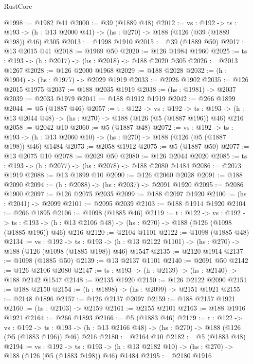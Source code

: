 \begin{lexlean}{RustCore}
\begin{coremodule}
@1998 := @1982 @41
@2000 := @39 (@1889 @48)
@2012 := {vs : @192} ->
  {ts : @193} -> (h : @13 @2000 @41) -> (hs : @270) -> @188 (@126 (@39 (@1889 @198)) @46) @305
@2013 := @1998 @1910
@2015 := @39 (@1889 @50)
@2017 := @13 @2015 @41
@2018 := @1969 @50
@2020 := @126 @1984 @1960
@2025 := {ts : @193} -> (h : @2017) -> (hs : @2018) -> @188 @2020 @305
@2026 := @2013 @1267
@2028 := @126 @2000 @1968
@2029 := @188 @2028
@2032 := (h : @1904) -> (hs : @1977) -> @2029 @1919
@2033 := @2026 @1902
@2035 := @126 @2015 @1975
@2037 := @188 @2035 @1919
@2038 := (hs : @1981) -> @2037
@2039 := @2033 @1979
@2041 := @188 @1912 @1919
@2042 := @266 @1899
@2044 := @5 (@1887 @46)
@2057 := {t : @122} ->
  {vs : @192} ->
  {ts : @193} -> (h : @13 @2044 @48) -> (hs : @270) -> @188 (@126 (@5 (@1887 @196)) @46) @216
@2058 := @2042 @10
@2060 := @5 (@1887 @48)
@2072 := {vs : @192} ->
  {ts : @193} -> (h : @13 @2060 @10) -> (hs : @270) -> @188 (@126 (@5 (@1887 @198)) @46) @1484
@2073 := @2058 @1912
@2075 := @5 (@1887 @50)
@2077 := @13 @2075 @10
@2078 := @2029 @50
@2080 := @126 @2044 @2020
@2085 := {ts : @193} -> (h : @2077) -> (hs : @2078) -> @188 @2080 @1484
@2086 := @2073 @1919
@2088 := @13 @1899 @10
@2090 := @126 @2060 @2028
@2091 := @188 @2090
@2094 := (h : @2088) -> (hs : @2037) -> @2091 @1920
@2095 := @2086 @1900
@2097 := @126 @2075 @2035
@2099 := @188 @2097 @1920
@2100 := (hs : @2041) -> @2099
@2101 := @2095 @2039
@2103 := @188 @1914 @1920
@2104 := @266 @1895
@2106 := @1098 (@1885 @46)
@2119 := {t : @122} ->
  {vs : @192} ->
  {ts : @193} -> (h : @13 @2106 @48) -> (hs : @270) -> @188 (@126 (@1098 (@1885 @196)) @46) @216
@2120 := @2104 @1101
@2122 := @1098 (@1885 @48)
@2134 := {vs : @192} ->
  {ts : @193} -> (h : @13 @2122 @1101) -> (hs : @270) -> @188 (@126 (@1098 (@1885 @198)) @46) @1547
@2135 := @2120 @1914
@2137 := @1098 (@1885 @50)
@2139 := @13 @2137 @1101
@2140 := @2091 @50
@2142 := @126 @2106 @2080
@2147 := {ts : @193} -> (h : @2139) -> (hs : @2140) -> @188 @2142 @1547
@2148 := @2135 @1920
@2150 := @126 @2122 @2090
@2151 := @188 @2150
@2154 := (h : @1898) -> (hs : @2099) -> @2151 @1921
@2155 := @2148 @1896
@2157 := @126 @2137 @2097
@2159 := @188 @2157 @1921
@2160 := (hs : @2103) -> @2159
@2161 := @2155 @2101
@2163 := @188 @1916 @1921
@2164 := @266 @1893
@2166 := @5 (@1883 @46)
@2179 := {t : @122} ->
  {vs : @192} ->
  {ts : @193} -> (h : @13 @2166 @48) -> (hs : @270) -> @188 (@126 (@5 (@1883 @196)) @46) @216
@2180 := @2164 @10
@2182 := @5 (@1883 @48)
@2194 := {vs : @192} ->
  {ts : @193} -> (h : @13 @2182 @10) -> (hs : @270) -> @188 (@126 (@5 (@1883 @198)) @46) @1484
@2195 := @2180 @1916

\end{coremodule}
\end{lexlean}
